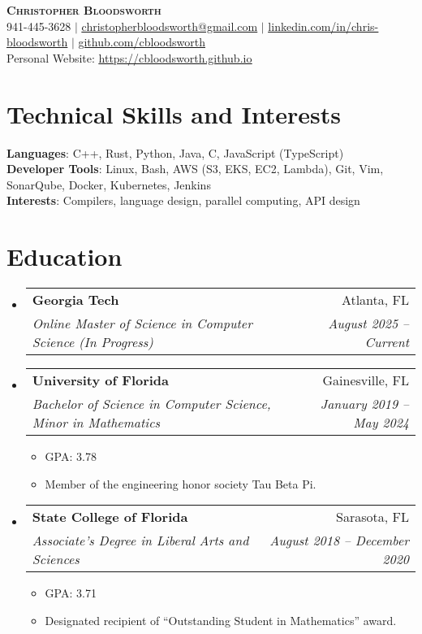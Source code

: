 \documentclass[letterpaper,11pt]{article}
\makeatletter
\newcommand{\resumeItem}[1]{
  \item\small{
    {#1 \vspace{-2pt}}
  }
}
\newcommand{\resumeSubheading}[4]{
  \vspace{-2pt}\item
    \begin{tabular*}{0.97\textwidth}[t]{l@{\extracolsep{\fill}}r}
      \textbf{#1} & #2 \\
      \textit{\small#3} & \textit{\small #4} \\
    \end{tabular*}\vspace{-7pt}
}
\newcommand{\resumeSubHeadingListStart}{\begin{itemize}[leftmargin=0.15in, label={}]}
\newcommand{\resumeSubHeadingListEnd}{\end{itemize}}
\newcommand{\resumeItemListStart}{\begin{itemize}}
\newcommand{\resumeItemListEnd}{\end{itemize}\vspace{-5pt}}
\makeatother
\begin{document}
\begin{center}
    \textbf{\Huge \scshape Christopher Bloodsworth} \\ \vspace{1pt}
    \small 941-445-3628 $|$ \href{christopherbloodsworth@gmail.com}{\underline{christopherbloodsworth@gmail.com}} $|$ 
    \href{https://www.linkedin.com/in/chris-bloodsworth/}{\underline{linkedin.com/in/chris-bloodsworth}} $|$
    \href{https://github.com/cbloodsworth}{\underline{github.com/cbloodsworth}} \\
    \small {Personal Website:} \href{https://cbloodsworth.github.io}{\underline{https://cbloodsworth.github.io}}
\end{center}

\section{Technical Skills and Interests}
 \begin{itemize}[leftmargin=0.15in, label={}]
    \small{\item{
     \textbf{Languages}{: C++, Rust, Python, Java, C, JavaScript (TypeScript)} \\
     \textbf{Developer Tools}{: Linux, Bash, AWS (S3, EKS, EC2, Lambda), Git, Vim, SonarQube, Docker, Kubernetes, Jenkins} \\
     \textbf{Interests}{: Compilers, language design, parallel computing, API design} \\
    }}
 \end{itemize}



\section{Education}
  \resumeSubHeadingListStart
    \resumeSubheading
      {Georgia Tech}{Atlanta, FL}
      {Online Master of Science in Computer Science (In Progress)}{August 2025 -- Current}
    \resumeSubheading
      {University of Florida}{Gainesville, FL}
      {Bachelor of Science in Computer Science, Minor in Mathematics}{January 2019 -- May 2024}
      \resumeItemListStart
        \resumeItem{GPA: 3.78}
        \resumeItem{Member of the engineering honor society Tau Beta Pi.}
      \resumeItemListEnd  
    \resumeSubheading
      {State College of Florida}{Sarasota, FL}
      {Associate's Degree in Liberal Arts and Sciences}{August 2018 -- December 2020}
      \resumeItemListStart
        \resumeItem{GPA: 3.71}
        \resumeItem{Designated recipient of “Outstanding Student in Mathematics” award.}
      \resumeItemListEnd  
  \resumeSubHeadingListEnd
\end{document}

